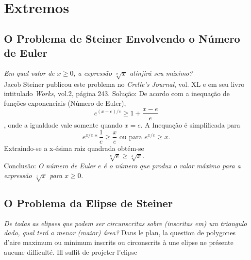 \chapter{Extremos}
\section{O Problema de Steiner Envolvendo o Número de Euler}
\textit{Em qual valor de $x \geq 0$, a expressão $\sqrt[x]x$ atinjirá seu máximo?}\\
Jacob Steiner publicou este problema no \textit{Crelle's Journal}, vol. XL e em seu livro intitulado \textit{Works}, vol.2, página 243.
Solução:
De acordo com a inequação de funções exponenciais (Número de Euler),
$$e^{(x-e)/e} \geq 1 + \frac{x - e}{e}$$,
onde a igualdade vale somente quando $x=e$. A Inequação é simplificada para
$$e^{x/e}*\frac{1}{e} \geq \frac{x}{e} \textrm{ ou para }  e^{x/e} \geq x.$$
 Extraindo-se a x-ésima raiz quadrada obtém-se
$$\sqrt[e]{e} \geq \sqrt[x]{x}.$$
Conclusão:
\textit{O número  de Euler $e$ é o número que produz o valor máximo para a expressão $\sqrt[x]{x}$ para $x \geq 0$.}

\section{O Problema da Elipse de Steiner}
\textit{De todas as elipses que podem ser circunscritas sobre (inscritas em) um triangulo dado, qual terá a menor (maior) área?}
Dans le plan, la question de polygones d'aire maximum ou minimum inscrits ou circonscrits à une elipse ne présente aucune difficulté. Ill suffit de projeter l'elipse
